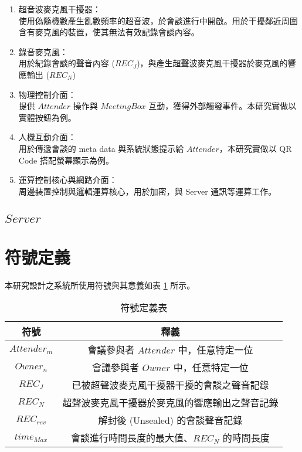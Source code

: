     \begin{enumerate}
        \item 超音波麥克風干擾器：\\
            使用偽隨機數產生亂數頻率的超音波，於會談進行中開啟。用於干擾鄰近周圍含有麥克風的裝置，使其無法有效記錄會談內容。

        \item 錄音麥克風：\\
            用於紀錄會談的聲音內容 ($REC_{J}$)，與產生超聲波麥克風干擾器於麥克風的響應輸出 ($REC_{N}$)

        \item 物理控制介面：\\
            提供 $Attender$ 操作與 $MeetingBox$ 互動，獲得外部觸發事件。本研究實做以實體按鈕為例。

        \item 人機互動介面：\\
            用於傳遞會談的 meta data 與系統狀態提示給 $Attender$，本研究實做以 QR Code 搭配螢幕顯示為例。

        \item 運算控制核心與網路介面：\\
            周邊裝置控制與邏輯運算核心，用於加密，與 Server 通訊等運算工作。
    \end{enumerate}


\subsection{$Server$}



\section{符號定義}

    本研究設計之系統所使用符號與其意義如表 \ref{table:tab.symbol} 所示。

\begin{table}[H]
    \centering
    \caption{符號定義表}
    \label{table:tab.symbol}
    \begin{tabular}{ c c }
        \hline
        \bf{符號} & \bf{釋義} \\
        \hline
        $Attender_{m}$ & 會議參與者 $Attender$ 中，任意特定一位 \\
        $Owner_{n}$    & 會議參與者 $Owner$ 中，任意特定一位 \\
        $REC_{J}$      & 已被超聲波麥克風干擾器干擾的會談之聲音記錄 \\
        $REC_{N}$      & 超聲波麥克風干擾器於麥克風的響應輸出之聲音記錄 \\
        $REC_{rev}$    & 解封後 (Unsealed) 的會談聲音記錄 \\
        $time_{Max}$   & 會談進行時間長度的最大值、$REC_{N}$ 的時間長度 \\
    \end{tabular}
\end{table}

